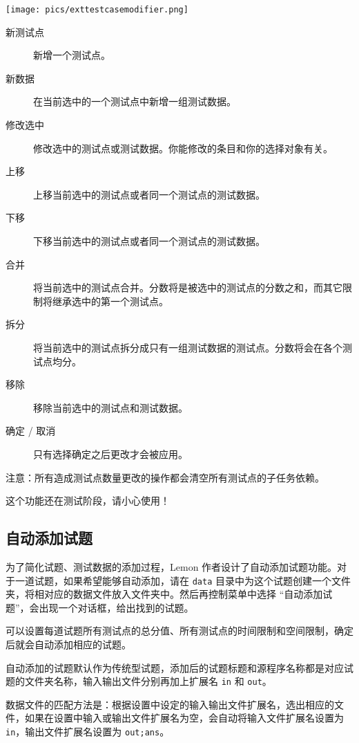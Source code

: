 \documentclass[UTF-8]{ctexart}
\begin{document}
    \begin{center}
        \texttt{[image: pics/exttestcasemodifier.png]}
    \end{center}

    \begin{description}
        \item[新测试点] 新增一个测试点。
        \item[新数据] 在当前选中的一个测试点中新增一组测试数据。
        \item[修改选中] 修改选中的测试点或测试数据。你能修改的条目和你的选择对象有关。
        \item[上移] 上移当前选中的测试点或者同一个测试点的测试数据。
        \item[下移] 下移当前选中的测试点或者同一个测试点的测试数据。
        \item[合并] 将当前选中的测试点合并。分数将是被选中的测试点的分数之和，而其它限制将继承选中的第一个测试点。
        \item[拆分] 将当前选中的测试点拆分成只有一组测试数据的测试点。分数将会在各个测试点均分。
        \item[移除] 移除当前选中的测试点和测试数据。
        \item[确定 / 取消] 只有选择确定之后更改才会被应用。
    \end{description}

    注意：所有造成测试点数量更改的操作都会清空所有测试点的子任务依赖。

    这个功能还在测试阶段，请小心使用！

    \subsection{自动添加试题}

    为了简化试题、测试数据的添加过程，Lemon 作者设计了自动添加试题功能。对于一道试题，如果希望能够自动添加，请在 \texttt{data} 目录中为这个试题创建一个文件夹，将相对应的数据文件放入文件夹中。然后再控制菜单中选择 “自动添加试题”，会出现一个对话框，给出找到的试题。

    可以设置每道试题所有测试点的总分值、所有测试点的时间限制和空间限制，确定后就会自动添加相应的试题。

    自动添加的试题默认作为传统型试题，添加后的试题标题和源程序名称都是对应试题的文件夹名称，输入输出文件分别再加上扩展名 \texttt{in} 和 \texttt{out}。

    数据文件的匹配方法是：根据设置中设定的输入输出文件扩展名，选出相应的文件，如果在设置中输入或输出文件扩展名为空，会自动将输入文件扩展名设置为 \texttt{in}，输出文件扩展名设置为 \texttt{out;ans}。
\end{document}
